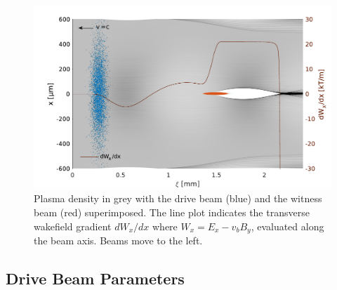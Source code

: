 \documentclass[aps,prstab,reprint,amsmath,amssymb,groupedaddress]{revtex4-1}
\begin{document}
\begin{figure}[hbt]
    \includegraphics[width=\linewidth,trim={2mm 0mm 2mm 0mm},clip]{figures/plasmaDenTWake}
    \caption{\label{Fig:PlasmaDenTWake} Plasma density in grey with the drive beam (blue) and the witness beam (red)
        superimposed. The line plot indicates the transverse wakefield gradient $dW_{x}/dx$ where
        $W_{x} = E_{x} - v_{b} B_{y}$, evaluated along the beam axis. Beams move to the left.}
\end{figure}

\subsection{Drive Beam Parameters}\label{S:M:Setup}

\end{document}
